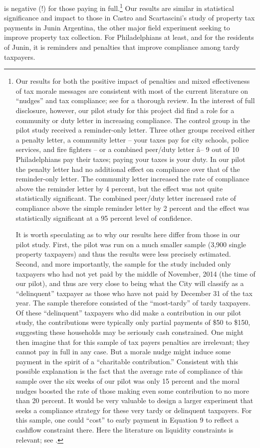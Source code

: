 \documentclass[12pt]{article}
\begin{document}
is negative (!) for those paying in full.\footnote{\label{fn:nudges}Our results for
  both the positive impact of penalties and mixed effectiveness of tax
  morale messages are consistent with most of the current literature
  on ``nudges'' and tax compliance; see \cite{Hallsworthb-14} for a
  thorough review. In the interest of full disclosure, however, our
  pilot study \cite{CILMS-16} for this project did find a role for a
  community or duty letter in increasing compliance.  The control
  group in the pilot study received a reminder-only letter.  Three
  other groups received either a penalty letter, a community letter --
  your taxes pay for city schools, police services, and fire fighters
  -- or a combined peer/duty letter â-- 9 out of 10 Philadelphians pay
  their taxes; paying your taxes is your duty. In our pilot the
  penalty letter had no additional effect on compliance over that of
  the reminder-only letter.  The community letter increased the rate
  of compliance above the reminder letter by 4 percent, but the effect
  was not quite statistically significant.  The combined peer/duty
  letter increased rate of compliance above the simple reminder letter
  by 2 percent and the effect was statistically significant at a 95
  percent level of confidence.

It is worth speculating as to why our results here differ from those
in our pilot study.  First, the pilot was run on a much smaller sample
(3,900 single property taxpayers) and thus the results were less
precisely estimated.  Second, and more importantly, the sample for the
study included only taxpayers who had not yet paid by the middle of
November, 2014 (the time of our pilot), and thus are very close to
being what the City will classify as a ``delinquent'' taxpayer as those
who have not paid by December 31 of the tax year.  The sample
therefore consisted of the ``most-tardy'' of tardy taxpayers.  Of
these ``delinquent'' taxpayers who did make a contribution in our pilot study, the contributions were typically only partial payments of
\$50 to \$150, suggesting these households may be seriously cash
constrained.  One might then imagine that for this sample of tax
payers penalties are irrelevant; they cannot pay in full in any case.
But a morale nudge might induce some payment in the spirit of a
``charitable contribution.''  Consistent with this possible explanation
is the fact that the average rate of compliance of this sample over
the six weeks of our pilot was only 15 percent and the moral nudges
boosted the rate of those making even some contribution to no more
than 20 percent.  It would be very valuable to design a larger
experiment that seeks a compliance strategy for these very tardy or
delinquent taxpayers. For this sample, one could ``cost'' to early payment in Equation 9 to reflect a cashflow constraint there. Here the literature on liquidity constraints is relevant; see .} Our results are similar in statistical
significance and impact to those in Castro and Scartascini's
\citeyear{castro} study of property tax payments in Junin Argentina,
the other major field experiment seeking to improve property tax
collection.  For Philadelphians at least, and for the residents of
Junin, it is reminders and penalties that improve compliance among
tardy taxpayers.
\end{document}
